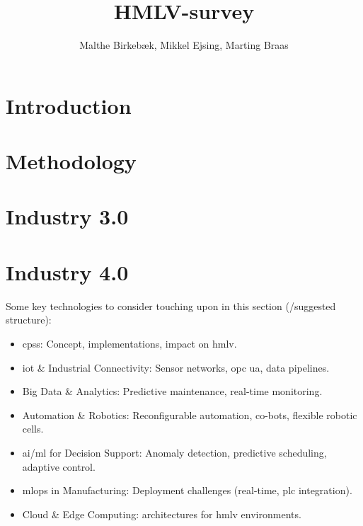 \documentclass{report}
\title{HMLV-survey}
\author{Malthe Birkebæk, Mikkel Ejsing, Marting Braas}
\date{}
\begin{document}
\thispagestyle{empty}
\maketitle

\newpage
\pagestyle{plain}

\tableofcontents 


\newpage
{}

\pagestyle{fancy}
\fancyhf{}  %
\renewcommand{\headrulewidth}{0pt}  %

\chapter{Introduction}



\chapter{Methodology}


\chapter{Industry 3.0} \label{chap:industry3.0}


\chapter{Industry 4.0}

Some key technologies to consider touching upon in this section (/suggested structure):
\begin{itemize}
    \item \ac{cps}s: Concept, implementations, impact on \ac{hmlv}.
    \item \ac{iot} \& Industrial Connectivity: Sensor networks, \ac{opc ua}, data pipelines.
    \item Big Data \& Analytics: Predictive maintenance, real-time monitoring.
    \item Automation \& Robotics: Reconfigurable automation, co-bots, flexible robotic cells.
    \item \ac{ai}/\ac{ml} for Decision Support: Anomaly detection, predictive scheduling, adaptive control.
    \item \ac{mlops} in Manufacturing: Deployment challenges (real-time, \ac{plc} integration).
    \item Cloud \& Edge Computing: architectures for \ac{hmlv} environments.
\end{itemize}
\end{document}
